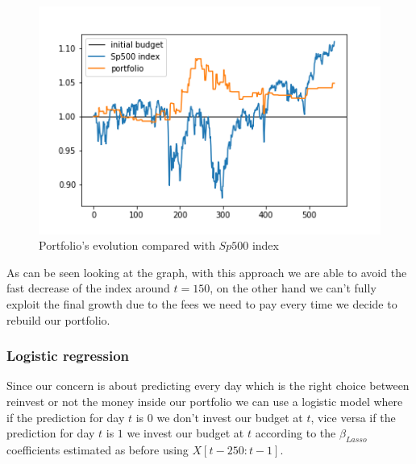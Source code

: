 \documentclass{article}%
\begin{document}
    \begin{figure}[h!]
  \centering
  \includegraphics[scale=0.6]{act_portfolio.png}
  \caption{Portfolio's evolution compared with $Sp500$ index}
  \label{portfolio_alpha}
  \end{figure}

As can be seen looking at the graph, with this approach we are able to avoid the fast decrease of the index around $t=150$, on the other hand we can't fully exploit the final growth due to the fees we need to pay every time we decide to rebuild our portfolio.

\subsubsection{Logistic regression}
Since our concern is about predicting every day which is the right choice between reinvest or not the money inside our portfolio we can use a logistic model where if the prediction for day $t$ is $0$ we don't invest our budget at $t$, vice versa if the prediction for day $t$ is $1$ we invest our budget at $t$ according to the $\beta_{Lasso}$ coefficients estimated as before using $X[t-250:t-1]$.
\end{document}
